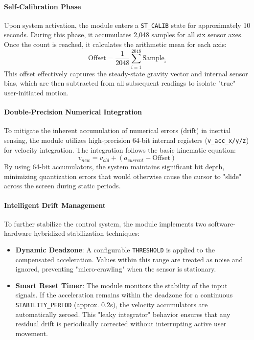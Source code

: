 \documentclass[12pt,a4paper]{article}
\begin{document}
\paragraph{Self-Calibration Phase}
Upon system activation, the module enters a \texttt{ST\_CALIB} state for approximately 10 seconds. During this phase, it accumulates 2,048 samples for all six sensor axes. Once the count is reached, it calculates the arithmetic mean for each axis:
\[ \text{Offset} = \frac{1}{2048} \sum_{i=1}^{2048} \text{Sample}_i \]
This offset effectively captures the steady-state gravity vector and internal sensor bias, which are then subtracted from all subsequent readings to isolate "true" user-initiated motion.

\paragraph{Double-Precision Numerical Integration}
To mitigate the inherent accumulation of numerical errors (drift) in inertial sensing, the module utilizes high-precision 64-bit internal registers (\texttt{v\_acc\_x/y/z}) for velocity integration. The integration follows the basic kinematic equation:
\[ v_{new} = v_{old} + (a_{current} - \text{Offset}) \]
By using 64-bit accumulators, the system maintains significant bit depth, minimizing quantization errors that would otherwise cause the cursor to "slide" across the screen during static periods.

\paragraph{Intelligent Drift Management}
To further stabilize the control system, the module implements two software-hardware hybridized stabilization techniques:
\begin{itemize}
    \item \textbf{Dynamic Deadzone}: A configurable \texttt{THRESHOLD} is applied to the compensated acceleration. Values within this range are treated as noise and ignored, preventing "micro-crawling" when the sensor is stationary.
    \item \textbf{Smart Reset Timer}: The module monitors the stability of the input signals. If the acceleration remains within the deadzone for a continuous \texttt{STABILITY\_PERIOD} (approx. 0.2s), the velocity accumulators are automatically zeroed. This "leaky integrator" behavior ensures that any residual drift is periodically corrected without interrupting active user movement.
\end{itemize}
\end{document}
